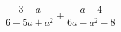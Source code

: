 \begin{ex}[type=expression]
	\begin{condition}
		\(\dfrac{3-a}{6-5a+a^2}+\dfrac{a-4}{6a-a^2-8}\)
	\end{condition}
\end{ex}
